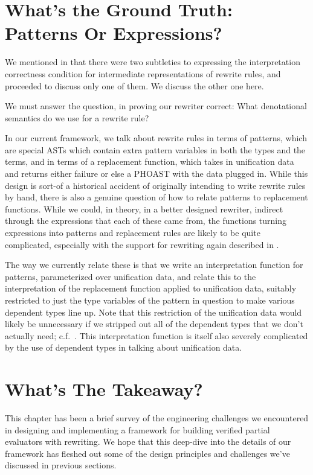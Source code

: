 \section{What's the Ground Truth: Patterns Or Expressions?}\label{sec:rewriting-more:patterns-vs-expressions}
We mentioned in  that there were two subtleties to expressing the interpretation correctness condition for intermediate representations of rewrite rules, and proceeded to discuss only one of them.
We discuss the other one here.

We must answer the question, in proving our rewriter correct:
What denotational semantics do we use for a rewrite rule?

In our current framework, we talk about rewrite rules in terms of patterns, which are special ASTs which contain extra pattern variables in both the types and the terms, and in terms of a replacement function, which takes in unification data and returns either failure or else a PHOAST with the data plugged in.
While this design is sort-of a historical accident of originally intending to write rewrite rules by hand, there is also a genuine question of how to relate patterns to replacement functions.
While we could, in theory, in a better designed rewriter, indirect through the expressions that each of these came from, the functions turning expressions into patterns and replacement rules are likely to be quite complicated, especially with the support for rewriting again described in .

The way we currently relate these is that we write an interpretation function for patterns, parameterized over unification data, and relate this to the interpretation of the replacement function applied to unification data, suitably restricted to just the type variables of the pattern in question to make various dependent types line up.
Note that this restriction of the unification data would likely be unnecessary if we stripped out all of the dependent types that we don't actually need; c.f.~.
This interpretation function is itself also severely complicated by the use of dependent types in talking about unification data.

\section{What's The Takeaway?}
This chapter has been a brief survey of the engineering challenges we encountered in designing and implementing a framework for building verified partial evaluators with rewriting.
We hope that this deep-dive into the details of our framework has fleshed out some of the design principles and challenges we've discussed in previous sections.

